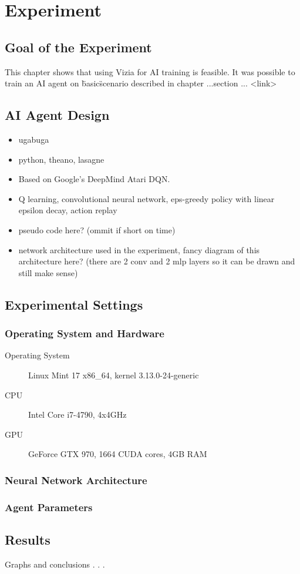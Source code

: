 \chapter{Experiment}

\section{Goal of the Experiment}
This chapter shows that using Vizia for AI training is feasible. It was possible to train an AI agent on \"basic\" scenario described in chapter ...section ... <link> 

\section{AI Agent Design}
\begin{itemize}
\item ugabuga
\item python, theano, lasagne
\item Based on Google's DeepMind Atari DQN.\cite{mnih-dqn-2015}
\item Q learning, convolutional neural network, eps-greedy policy with linear epsilon decay, action replay
\item pseudo code here? (ommit if short on time)
\item network architecture used in the experiment, fancy diagram of this architecture here? (there are 2 conv and 2 mlp layers so it can be drawn and still make sense)
\end{itemize}

\section{Experimental Settings} 

	\subsection{Operating System and Hardware}
	\begin{description}
		\item[Operating System] Linux Mint 17 x86\_64, kernel 3.13.0-24-generic
		\item[CPU] Intel Core i7-4790, 4x4GHz
		\item[GPU] GeForce GTX 970, 1664 CUDA cores, 4GB RAM
	\end{description}


	\subsection{Neural Network Architecture}
	
	\subsection{Agent Parameters}

\section{Results}
Graphs and conclusions . . .